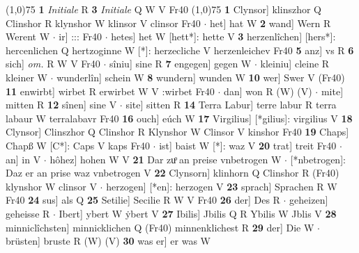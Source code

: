 \documentclass[8pt,a4paper,notitlepage]{article}
\begin{document}
\begin{table}[ht]
\begin{minipage}[t]{0.5\linewidth}
\line(1,0){75} \newline
\textbf{1} \textit{Initiale} R  \textbf{3} \textit{Initiale} Q W V Fr40  \newline
\line(1,0){75} \newline
\textbf{1} Clynsor] klinszhor Q Clinshor R klynshor W klinsor V clinsor Fr40  $\cdot$ het] hat W \textbf{2} wand] Wern R Werent W  $\cdot$ ir] ::: Fr40  $\cdot$ hetes] het W [hett*]: hette V \textbf{3} herzenlîchen] [hers*]: hercenlichen Q hertzoginne W [*]: herzecliche V herzenleichev Fr40 \textbf{5} anz] vs R \textbf{6} sich] \textit{om.} R W V Fr40  $\cdot$ sîniu] sine R \textbf{7} engegen] gegen W  $\cdot$ kleiniu] cleine R kleiner W  $\cdot$ wunderlîn] schein W \textbf{8} wundern] wunden W \textbf{10} wer] Swer V (Fr40) \textbf{11} enwirbt] wirbet R erwirbet W V :wirbet Fr40  $\cdot$ dan] won R (W) (V)  $\cdot$ mite] mitten R \textbf{12} sînen] sine V  $\cdot$ site] sitten R \textbf{14} Terra Labur] terre labur R terra labaur W terralabavr Fr40 \textbf{16} ouch] eúch W \textbf{17} Virgilius] [*gilius]: virgilius V \textbf{18} Clynsor] Clinszhor Q Clinshor R Klynshor W Clinsor V kinshor Fr40 \textbf{19} Chaps] Chapß W [C*]: Caps V kaps Fr40  $\cdot$ ist] baist W [*]: waz V \textbf{20} trat] treit Fr40  $\cdot$ an] in V  $\cdot$ hôhez] hohen W V \textbf{21} Dar zuͦ an preise vnbetrogen W  $\cdot$ [*nbetrogen]: Daz er an prise waz vnbetrogen V \textbf{22} Clynsorn] klinhorn Q Clinshor R (Fr40) klynshor W clinsor V  $\cdot$ herzogen] [*en]: herzogen V \textbf{23} sprach] Sprachen R W Fr40 \textbf{24} sus] als Q \textbf{25} Setilie] Secilie R W V Fr40 \textbf{26} der] Des R  $\cdot$ geheizen] geheisse R  $\cdot$ Ibert] ybert W ẏbert V \textbf{27} Ibilis] Jbilis Q R Ybilis W Jblis V \textbf{28} minniclîchsten] minnicklichen Q (Fr40) minnenklichest R \textbf{29} der] Die W  $\cdot$ brüsten] bruste R (W) (V) \textbf{30} was er] er was W \newline
\end{minipage}
\end{table}
\end{document}
